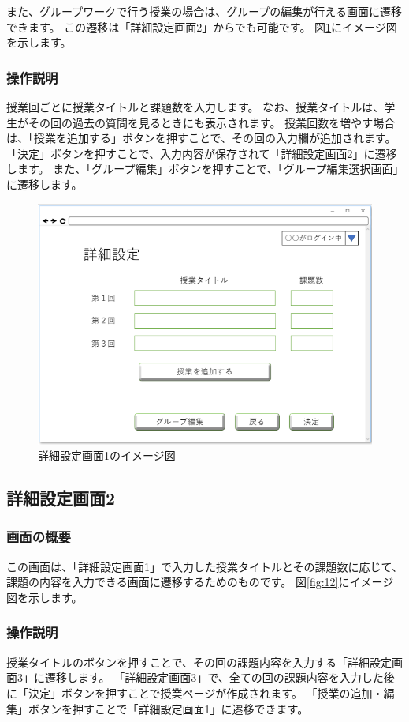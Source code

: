 また、グループワークで行う授業の場合は、グループの編集が行える画面に遷移できます。
この遷移は「詳細設定画面2」からでも可能です。
図\ref{fig:11}にイメージ図を示します。

\subsubsection{操作説明}
授業回ごとに授業タイトルと課題数を入力します。
なお、授業タイトルは、学生がその回の過去の質問を見るときにも表示されます。
授業回数を増やす場合は、「授業を追加する」ボタンを押すことで、その回の入力欄が追加されます。
「決定」ボタンを押すことで、入力内容が保存されて「詳細設定画面2」に遷移します。
また、「グループ編集」ボタンを押すことで、「グループ編集選択画面」に遷移します。

\begin{figure}[htbp]
  \begin{center}
    \includegraphics[width=0.7\linewidth,clip]{./img/11.png}
    \caption{詳細設定画面1のイメージ図}\label{fig:11}
  \end{center}
\end{figure}

\newpage

\subsection{詳細設定画面2}
\subsubsection{画面の概要}
この画面は、「詳細設定画面1」で入力した授業タイトルとその課題数に応じて、課題の内容を入力できる画面に遷移するためのものです。
図\ref{fig:12}にイメージ図を示します。

\subsubsection{操作説明}
授業タイトルのボタンを押すことで、その回の課題内容を入力する「詳細設定画面3」に遷移します。
「詳細設定画面3」で、全ての回の課題内容を入力した後に「決定」ボタンを押すことで授業ページが作成されます。
「授業の追加・編集」ボタンを押すことで「詳細設定画面1」に遷移できます。

